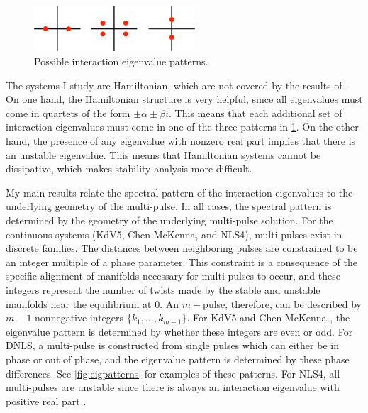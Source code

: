 \documentclass[12pt,reqno,oneside]{article}
\theoremstyle{definition}
\theoremstyle{remark}
\begin{document}
\begin{figure}
\includegraphics[width=6cm]{images/inteigpattern.eps}
\caption{Possible interaction eigenvalue patterns.} 
\label{fig:inteigpattern}
\end{figure}
The systems I study are Hamiltonian, which are not covered by the results of \cite{Sandstede1998}. On one hand, the Hamiltonian structure is very helpful, since all eigenvalues must come in quartets of the form $\pm \alpha \pm \beta i$. This means that each additional set of interaction eigenvalues must come in one of the three patterns in \cref{fig:inteigpattern}. On the other hand, the presence of any eigenvalue with nonzero real part implies that there is an unstable eigenvalue. This means that Hamiltonian systems cannot be dissipative, which makes stability analysis more difficult. 

My main results relate the spectral pattern of the interaction eigenvalues to the underlying geometry of the multi-pulse. In all cases, the spectral pattern is determined by the geometry of the underlying multi-pulse solution. For the continuous systems (KdV5, Chen-McKenna, and NLS4), multi-pulses exist in discrete families. The distances between neighboring pulses are constrained to be an integer multiple of a phase parameter. This constraint is a consequence of the specific alignment of manifolds necessary for multi-pulses to occur, and these integers represent the number of twists made by the stable and unstable manifolds near the equilibrium at 0. An $m-$pulse, therefore, can be described by $m-1$ nonnegative integers $\{ k_1, \dots, k_{m-1} \}$. For KdV5 \cite{Pelinovsky2007} and Chen-McKenna \cite{Kapitula2020}, the eigenvalue pattern is determined by whether these integers are even or odd. For DNLS, a multi-pulse is constructed from single pulses which can either be in phase or out of phase, and the eigenvalue pattern is determined by these phase differences. See \cref{fig:eigpatterns} for examples of these patterns. For NLS4, all multi-pulses are unstable since there is always an interaction eigenvalue with positive real part \cite{Parker2020NLS4}. 
\end{document}
